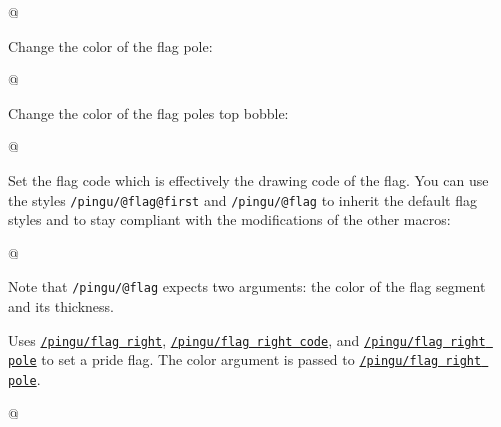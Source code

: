 \documentclass[parskip=half,english,numbers=noenddot,footnotes=nomultiple,oneside]{scrartcl}
\def\lpingu#1{\lstinline[style=lstpingu,language=pingulang]'#1'}
\newcommand*\keyref[2][/pingu/]{\hyperref[pk:#1#2]{\lpingu{#1#2}}}
\begin{document}
\begin{tcblisting}{@}
\begin{tikzpicture}
	\pingu[flag right=green]
\end{tikzpicture}
\end{tcblisting}
\endkeyexplain

Change the color of the flag pole:
	\begin{tcblisting}{@}
\begin{tikzpicture}
	\pingu[flag right, flag right pole=green]
\end{tikzpicture}
\end{tcblisting}
\endsubkeyexplain

Change the color of the flag poles top bobble:
	\begin{tcblisting}{@}
\begin{tikzpicture}
	\pingu[flag right, flag right bobble=green]
\end{tikzpicture}
\end{tcblisting}
\endsubkeyexplain

Set the flag code which is effectively the drawing code of the flag.
You can use the styles \lpingu{/pingu/@flag@first} and \lpingu{/pingu/@flag} to inherit the default flag styles and to stay compliant with the modifications of the other macros:
	\begin{tcblisting}{@}
\begin{tikzpicture}
	\pingu[flag right, flag right code={
	  \node[/pingu/@flag@first,
	  	/pingu/@flag={blue}{5mm}]
	  		(upper) at (0,0) {};
	  \node[below,/pingu/@flag={black}{4mm}]
	  	(lower) at (upper.south) {};
	}]
\end{tikzpicture}
\end{tcblisting}
Note that \lpingu{/pingu/@flag} expects two arguments: the color of the flag segment and its thickness.
\endsubkeyexplain

	Uses \keyref{flag right}, \keyref{flag right code}, and \keyref{flag right pole} to set a pride flag. The color argument is passed to \keyref{flag right pole}.
\begin{tcblisting}{@}
\begin{tikzpicture}
	\pingu[pride flag right=green]
\end{tikzpicture}
\end{tcblisting}
\endkeyexplain
\end{document}
